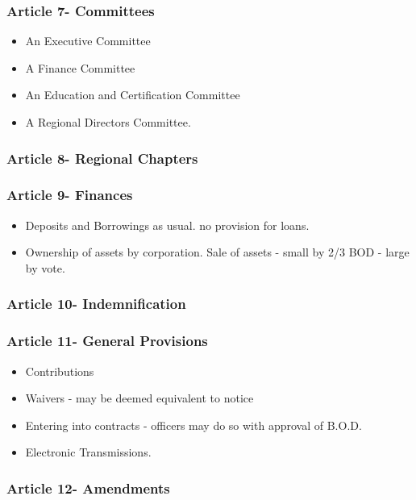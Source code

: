\subsubsection{Article 7- Committees}
\begin{itemize} \item An Executive Committee\item A Finance Committee
\item An Education and Certification Committee \item  A Regional
Directors Committee.
\end{itemize}
\subsubsection{Article 8- Regional Chapters}
\subsubsection{Article 9- Finances}
\begin{itemize} \item Deposits and Borrowings as usual. no
provision for loans. \item Ownership of assets by corporation.
Sale of assets - small by 2/3 BOD - large by vote.
\end{itemize}
\subsubsection{Article 10- Indemnification}

\subsubsection{Article 11- General Provisions}
\begin{itemize} \item Contributions\item Waivers - may be deemed
equivalent to notice \item Entering into contracts - officers may
do so with approval of B.O.D. \item Electronic Transmissions.
\end{itemize}

\subsubsection{Article 12- Amendments}
